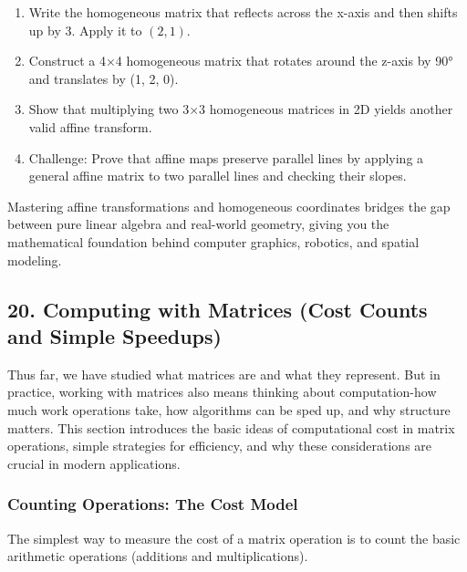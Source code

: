 \documentclass[
  letterpaper,
  DIV=11,
  numbers=noendperiod]{scrreprt}
\providecommand{\tightlist}{%
  \setlength{\itemsep}{0pt}\setlength{\parskip}{0pt}}
\begin{document}
\begin{enumerate}
\def\labelenumi{\arabic{enumi}.}
\tightlist
\item
  Write the homogeneous matrix that reflects across the x-axis and then
  shifts up by 3. Apply it to \((2, 1)\).
\item
  Construct a 4×4 homogeneous matrix that rotates around the z-axis by
  90° and translates by (1, 2, 0).
\item
  Show that multiplying two 3×3 homogeneous matrices in 2D yields
  another valid affine transform.
\item
  Challenge: Prove that affine maps preserve parallel lines by applying
  a general affine matrix to two parallel lines and checking their
  slopes.
\end{enumerate}

Mastering affine transformations and homogeneous coordinates bridges the
gap between pure linear algebra and real-world geometry, giving you the
mathematical foundation behind computer graphics, robotics, and spatial
modeling.

\subsection{20. Computing with Matrices (Cost Counts and Simple
Speedups)}\label{computing-with-matrices-cost-counts-and-simple-speedups}

Thus far, we have studied what matrices are and what they represent. But
in practice, working with matrices also means thinking about
computation-how much work operations take, how algorithms can be sped
up, and why structure matters. This section introduces the basic ideas
of computational cost in matrix operations, simple strategies for
efficiency, and why these considerations are crucial in modern
applications.

\subsubsection{Counting Operations: The Cost
Model}\label{counting-operations-the-cost-model}

The simplest way to measure the cost of a matrix operation is to count
the basic arithmetic operations (additions and multiplications).
\end{document}
